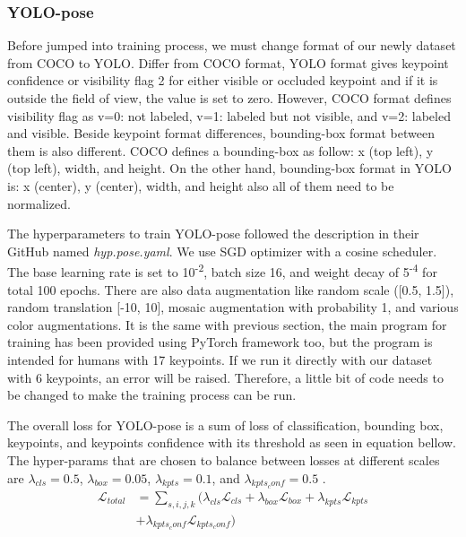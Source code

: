 \subsubsection{YOLO-pose}
\label{subsubsec:training-yolo-pose}

Before jumped into training process, we must change format of our newly dataset from COCO to YOLO. Differ from COCO format, YOLO format gives keypoint confidence or visibility flag 2 for either visible or occluded keypoint
and if it is outside the field of view, the value is set to zero. However, COCO format defines visibility flag as v=0: not labeled, v=1: labeled but not visible, and v=2: labeled and visible. 
Beside keypoint format differences, bounding-box format between them is also different. COCO defines a bounding-box as follow: x (top left), y (top left), width, and height. On the other hand,
bounding-box format in YOLO is: x (center), y (center), width, and height also all of them need to be normalized.

The hyperparameters to train YOLO-pose followed the description in their GitHub named \emph{hyp.pose.yaml}.
We use SGD optimizer with a cosine scheduler. The base learning rate is set to 10\textsuperscript{-2}, batch size 16,
and weight decay of 5\textsuperscript{-4} for total 100 epochs. There are also data augmentation like random scale ([0.5, 1.5]),
random translation [-10, 10], mosaic augmentation with probability 1, and various color augmentations.
It is the same with previous section, the main program for training has been provided using PyTorch framework too, but the program is intended for humans with 17 keypoints.
If we run it directly with our dataset with 6 keypoints, an error will be raised. Therefore, a little bit of code needs to be changed to make the training process can be run.

The overall loss for YOLO-pose is a sum of loss of classification, bounding box, keypoints, and keypoints confidence with its threshold as seen in equation bellow.
The hyper-params that are chosen to balance between losses at different scales are $\lambda_{cls} = 0.5$, $\lambda_{box} = 0.05$, $\lambda_{kpts} = 0.1$, and $\lambda_{kpts_conf} = 0.5$ \citep{maji2022yolopose}.
\begin{equation} \label{eq:overall-loss-yolo}
  \begin{split}
    \mathcal{L}_{total} & = \sum_{s,i,j,k} (\lambda_{cls}\mathcal{L}_{cls} + \lambda_{box}\mathcal{L}_{box} + \lambda_{kpts}\mathcal{L}_{kpts} \\
    & + \lambda_{kpts_conf}\mathcal{L}_{kpts_conf})
  \end{split}
\end{equation}

